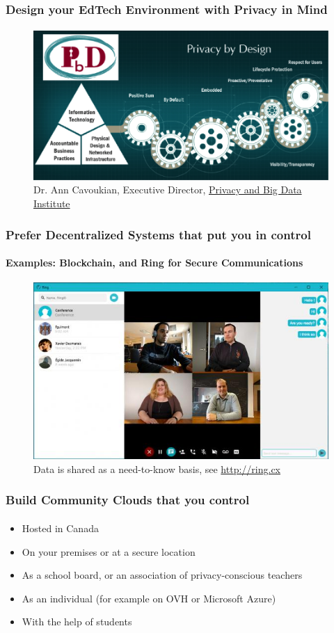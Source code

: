 \documentclass{beamer}
\begin{document}
	\begin{frame}
	\frametitle{Design your EdTech Environment with Privacy in Mind}
	\framesubtitle{}
	       	\begin{figure}[h]
               	\centering
               	\includegraphics[width=.8\textwidth]{./images/privacybydesign}
		\caption{Dr. Ann Cavoukian, Executive Director, \href{http://www.ryerson.ca/pbdi/privacy-by-design/certification/TheSevenFoundationalPrinciplesofPrivacybyDesign/}{Privacy and Big Data Institute}}
        	\end{figure}
	\end{frame}

	\begin{frame}
	\frametitle{Prefer Decentralized Systems that put you in control}
	\framesubtitle{Examples: Blockchain, and Ring for Secure Communications}
	        \begin{figure}[h]
                \centering
                \includegraphics[width=.8\textwidth]{./images/ring_interface_desktop}
		\caption{Data is shared as a need-to-know basis, see \url{http://ring.cx}}
        	\end{figure}
	\end{frame}

	\begin{frame}
	\frametitle{Build Community Clouds that you control}
	\framesubtitle{}
		\begin{itemize}[<+->]
			\item Hosted in Canada
			\item On your premises or at a secure location
			\item As a school board, or an association of privacy-conscious teachers
			\item As an individual (for example on OVH or Microsoft Azure)
			\item With the help of students 
		\end{itemize}
	\end{frame}
\end{document}
